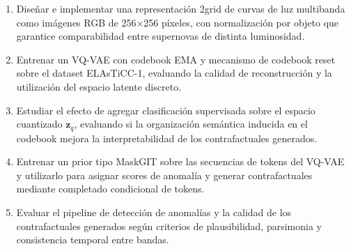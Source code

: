 \begin{enumerate}
    \item Diseñar e implementar una representación 2grid de curvas de luz multibanda como imágenes RGB de 256×256 píxeles, con normalización por objeto que garantice comparabilidad entre supernovas de distinta luminosidad.

    \item Entrenar un VQ-VAE con codebook EMA y mecanismo de codebook reset sobre el dataset ELAsTiCC-1, evaluando la calidad de reconstrucción y la utilización del espacio latente discreto.

    \item Estudiar el efecto de agregar clasificación supervisada sobre el espacio cuantizado $\mathbf{z}_q$, evaluando si la organización semántica inducida en el codebook mejora la interpretabilidad de los contrafactuales generados.

    \item Entrenar un prior tipo MaskGIT sobre las secuencias de tokens del VQ-VAE y utilizarlo para asignar scores de anomalía y generar contrafactuales mediante completado condicional de tokens.

    \item Evaluar el pipeline de detección de anomalías y la calidad de los contrafactuales generados según criterios de plausibilidad, parsimonia y consistencia temporal entre bandas.
\end{enumerate}
